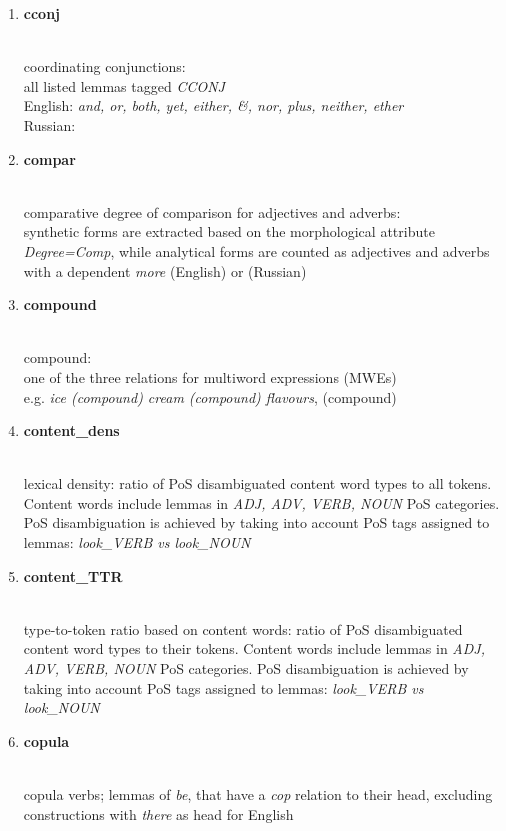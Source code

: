 \begin{enumerate}
	\item \hypertarget{ft:cconj}{\textbf{cconj}} \\
		coordinating conjunctions: \\
		all listed lemmas tagged \textit{CCONJ} \\
		English: \textit{and, or, both, yet, either, \&, nor, plus, neither, ether} \\
		Russian: 
	
	\item \hypertarget{ft:compar}{\textbf{compar}} \\
		comparative degree of comparison for adjectives and adverbs: \\
		synthetic forms are extracted based on the morphological attribute \textit{Degree=Comp}, while analytical forms are counted as adjectives and adverbs with a dependent \textit{more} (English) or  (Russian)
	
	\item \hypertarget{ft:compound}{\textbf{compound}} \\
		compound: \\
		one of the three relations for multiword expressions (MWEs) \\
		e.g. \textit{ice (compound) cream (compound) flavours},  (compound) 
	
	\item \hypertarget{ft:content\_dens}{\textbf{content\_dens}} \\
		lexical density: ratio of PoS disambiguated content word types to all tokens. Content words include lemmas in \textit{ADJ, ADV, VERB, NOUN} PoS categories. PoS disambiguation is achieved by taking into account PoS tags assigned to lemmas: \textit{look\_VERB vs look\_NOUN}
	
	\item \hypertarget{ft:content\_TTR}{\textbf{content\_TTR}} \\
		type-to-token ratio based on content words: ratio of PoS disambiguated content word types to their tokens. Content words include lemmas in \textit{ADJ, ADV, VERB, NOUN} PoS categories. PoS disambiguation is achieved by taking into account PoS tags assigned to lemmas: \textit{look\_VERB vs look\_NOUN} 
	
	\item \hypertarget{ft:copula}{\textbf{copula}} \\
		copula verbs; lemmas of \textit{be},  that have a \textit{cop} relation to their head, excluding constructions with \textit{there} as head for English
	

\end{enumerate}
